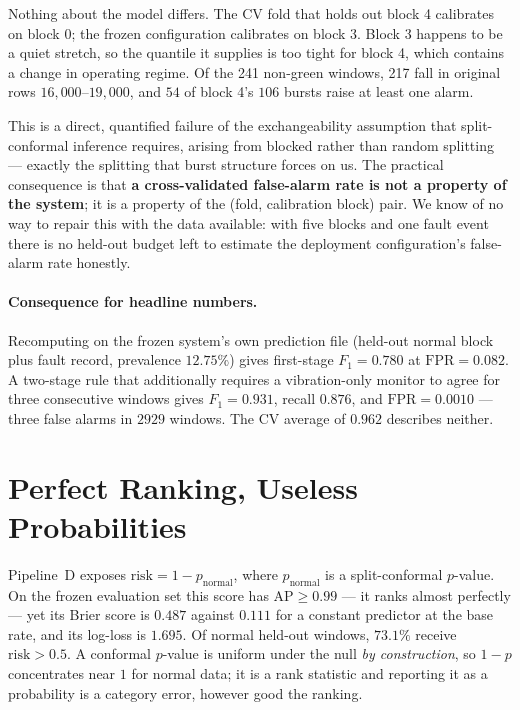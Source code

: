 \documentclass{article}
\begin{document}
Nothing about the model differs. The CV fold that holds out block 4 calibrates
on block 0; the frozen configuration calibrates on block 3. Block 3 happens to
be a quiet stretch, so the quantile it supplies is too tight for block 4, which
contains a change in operating regime. Of the 241 non-green windows, 217 fall
in original rows $16{,}000$--$19{,}000$, and $54$ of block 4's $106$ bursts
raise at least one alarm.

This is a direct, quantified failure of the exchangeability assumption that
split-conformal inference requires, arising from blocked rather than random
splitting --- exactly the splitting that burst structure forces on us. The
practical consequence is that \textbf{a cross-validated false-alarm rate is not
a property of the system}; it is a property of the (fold, calibration block)
pair. We know of no way to repair this with the data available: with five
blocks and one fault event there is no held-out budget left to estimate the
deployment configuration's false-alarm rate honestly.

\paragraph{Consequence for headline numbers.} Recomputing on the frozen
system's own prediction file (held-out normal block plus fault record,
prevalence $12.75\%$) gives first-stage $F_1 = 0.780$ at
$\mathrm{FPR} = 0.082$. A two-stage rule that additionally requires a
vibration-only monitor to agree for three consecutive windows gives
$F_1 = 0.931$, recall $0.876$, and $\mathrm{FPR} = 0.0010$ --- three false
alarms in $2929$ windows. The CV average of $0.962$ describes neither.

\section{Perfect Ranking, Useless Probabilities}
\label{sec:calib}

Pipeline~D exposes $\mathrm{risk} = 1 - p_{\text{normal}}$, where
$p_{\text{normal}}$ is a split-conformal $p$-value. On the frozen evaluation
set this score has $\mathrm{AP} \ge 0.99$ --- it ranks almost perfectly --- yet
its Brier score is $\mathbf{0.487}$ against $\mathbf{0.111}$ for a constant
predictor at the base rate, and its log-loss is $1.695$. Of normal held-out
windows, $73.1\%$ receive $\mathrm{risk} > 0.5$. A conformal $p$-value is
uniform under the null \emph{by construction}, so $1-p$ concentrates near $1$
for normal data; it is a rank statistic and reporting it as a probability is a
category error, however good the ranking.
\end{document}
